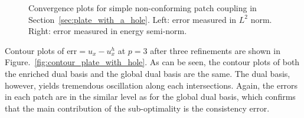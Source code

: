 \begin{figure}[ht]
	\center
	\captionsetup[subfigure]{labelformat=empty}
	\begin{subfigure}{.45\linewidth}
		\center
		
	\end{subfigure}\hspace{2mm}
	\begin{subfigure}{.45\linewidth}
		\center
		
	\end{subfigure}
	\caption{Convergence plots for simple non-conforming patch coupling in Section~\ref{sec:plate_with_a_hole}. Left: error measured in $L^2$ norm. Right: error measured in energy semi-norm.}\label{fig:convergence_plate_with_hole}
\end{figure}

Contour plots of $\text{err} = u_x - u_x^h$ at $p=3$ after three refinements are shown in Figure.~\ref{fig:contour_plate_with_hole}. As can be seen, the contour plots of both the enriched dual basis and the global dual basis are the same. The \Bezier dual basis, however, yields tremendous oscillation along each intersections. Again, the errors in each patch are in the similar level as for the global dual basis, which confirms that the main contribution of the sub-optimality is the consistency error.

